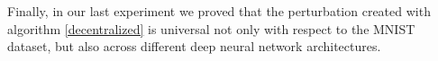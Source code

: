 Finally, in our last experiment we proved that the perturbation created with algorithm \ref{decentralized} is universal
not only with respect to the MNIST dataset, but also across different deep neural network architectures.

